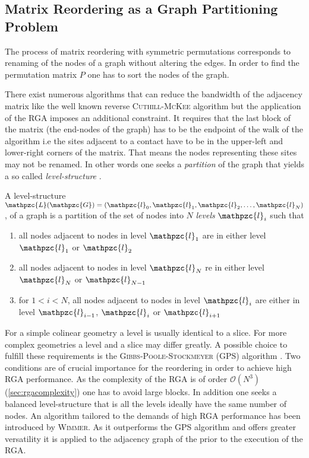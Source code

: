 \subsection{Matrix Reordering as a Graph Partitioning Problem}
The process of matrix reordering with symmetric permutations corresponds to renaming of the nodes of a graph without altering the edges. In order to find the permutation matrix $P$ one has to sort the nodes of the graph.\par
There exist numerous algorithms that can reduce the bandwidth of the adjacency matrix like the well known reverse \textsc{Cuthill-McKee} algorithm but the application of the RGA imposes an additional constraint. It requires that the last block of the matrix (the end-nodes of the graph) has to be the endpoint of the walk of the algorithm i.e the sites adjacent to a contact have to be in the upper-left and lower-right corners of the matrix. That means the nodes representing these sites may not be renamed. In other words one seeks a \emph{partition} of the graph that yields a so called \emph{level-structure} \cite{gibbs.Siam.13.236}.
\begin{dfn}
A level-structure $\mathpzc{L}(\mathpzc{G}) = (\mathpzc{l}_0,\mathpzc{l}_1,\mathpzc{l}_2,\dotsc,\mathpzc{l}_N)$, of a graph  is a partition of the set of nodes  into $N$ \emph{levels} $\mathpzc{l}_i$ such that
\begin{enumerate}
\item all nodes adjacent to nodes in level $\mathpzc{l}_1$ are in either level $\mathpzc{l}_1$ or $\mathpzc{l}_2$
\item all nodes adjacent to nodes in level $\mathpzc{l}_N$ re in either level $\mathpzc{l}_{N}$ or $\mathpzc{l}_{N-1}$
\item for $1 < i < N$, all nodes adjacent to nodes in level $\mathpzc{l}_{i}$ are either in level $\mathpzc{l}_{i-1}$, $\mathpzc{l}_{i}$ or $\mathpzc{l}_{i+1}$
\end{enumerate}
\end{dfn}
For a simple colinear geometry a level is usually identical to a slice. For more complex geometries a level and a slice may differ greatly. A possible choice to fulfill these requirements is the \textsc{Gibbs-Poole-Stockmeyer} (GPS) algorithm \cite{gibbs.Siam.13.236}. Two conditions are of crucial importance for the reordering in order to achieve high RGA performance. As the complexity of the RGA is of order $\mathcal{O}(N^3)$(\cref{sec:rgacomplexity}) one has to avoid large blocks. In addition one seeks a balanced level-structure that is all the levels ideally have the same number of nodes.
An algorithm tailored to the demands of high RGA performance has been introduced by \textsc{Wimmer}. As it outperforms the GPS algorithm and offers greater versatility \cite{Wimmer2009JComPhys} it is applied to the adjacency graph of the \hamil{} prior to the execution of the RGA.
